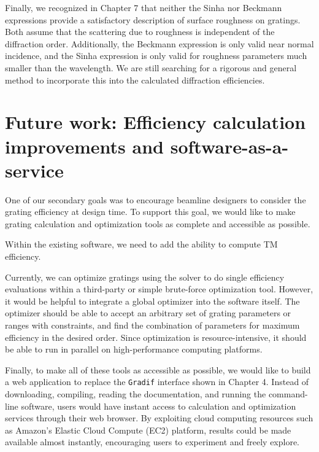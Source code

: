 Finally, we recognized in Chapter 7 that neither the Sinha nor Beckmann expressions provide a satisfactory description of surface roughness on gratings.  Both assume that the scattering due to roughness is independent of the diffraction order.  Additionally, the Beckmann expression is only valid near normal incidence, and the Sinha expression is only valid for roughness parameters much smaller than the wavelength.  We are still searching for a rigorous and general method to incorporate this into the calculated diffraction efficiencies.

\section{Future work: Efficiency calculation improvements and software-as-a-service}
One of our secondary goals was to encourage beamline designers to consider the grating efficiency at design time.  To support this goal, we would like to make grating calculation and optimization tools as complete and accessible as possible.

Within the existing software, we need to add the ability to compute TM efficiency.

Currently, we can optimize gratings using the solver to do single efficiency evaluations within a third-party or simple brute-force optimization tool.  However, it would be helpful to integrate a global optimizer into the software itself.  The optimizer should be able to accept an arbitrary set of grating parameters or ranges with constraints, and find the combination of parameters for maximum efficiency in the desired order.  Since optimization is resource-intensive, it should be able to run in parallel on high-performance computing platforms.

Finally, to make all of these tools as accessible as possible, we would like to build a web application to replace the \texttt{Gradif} interface shown in Chapter 4.  Instead of downloading, compiling, reading the documentation, and running the command-line software, users would have instant access to calculation and optimization services through their web browser.  By exploiting cloud computing resources such as Amazon's Elastic Cloud Compute (EC2) platform, results could be made available almost instantly, encouraging users to experiment and freely explore.